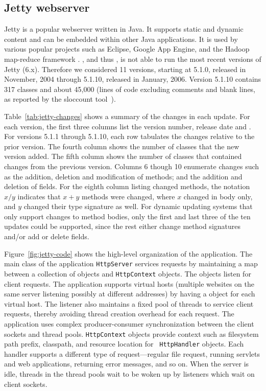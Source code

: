 \subsection{Jetty webserver}
\label{subsec:jetty}

Jetty is a popular webserver written in Java. It supports static and
dynamic content and can be embedded within other Java applications. It is
used by various popular projects such as Eclipse, Google App Engine, and
the Hadoop map-reduce framework \cite{jetty-uses}.  \RVM, and thus \JV, is
not able to run the most recent versions of Jetty (6.x).  Therefore we
considered 11 versions, starting at 5.1.0, released in November, 2004
through 5.1.10, released in January, 2006.
Version 5.1.10 contains 317 classes and about 45,000 \SLOC (lines of code
excluding comments and blank lines, as reported by the sloccount
tool~\cite{sloccount, sloccount-wiki}).



Table~\ref{tab:jetty-changes} shows a summary of the changes in each
update. For each version, the first three columns list the version number,
release date and \SLOC. For versions 5.1.1 through 5.1.10,
each row tabulates the changes relative to the prior version. The fourth
column shows the number of classes that the new version added. The fifth
column shows the number of classes that contained changes from the previous
version. Columns 6 though 10 enumerate changes such as the addition,
deletion and modification of methods; and the addition and deletion of
fields. For the eighth column listing changed methods, the notation $x/y$
indicates that $x+y$ methods were changed, where $x$ changed in body only,
and $y$ changed their type signature as well. For dynamic updating systems
that only support changes to method bodies, only the first and last three
of the ten updates could be supported, since the rest either change method
signatures and/or add or delete fields.




Figure~\ref{fig:jetty-code} shows the high-level organization of the
application. The main class of the application {\tt HttpServer} services
\HTTP requests by maintaining a map between a collection of \HttpListener
objects and {\tt HttpContext} objects. The \HttpListener
objects listen for client requests. The application supports virtual hosts
(multiple websites on the same server listening possibly at different
addresses) by having a \HttpListener object for each virtual host. The
listener also maintains a fixed pool of threads to service client requests,
thereby avoiding thread creation overhead for each request. The application
uses complex producer-consumer synchronization between the client sockets
and thread pools. {\tt HttpContext} objects provide context such as
filesystem path prefix, classpath, and resource location for {\tt
HttpHandler} objects. Each handler supports a different type of
request---regular file request, running servlets and web applications,
returning error messages, and so on. When the server is idle, threads in
the thread pools wait to be woken up by listeners which wait on client
sockets.


